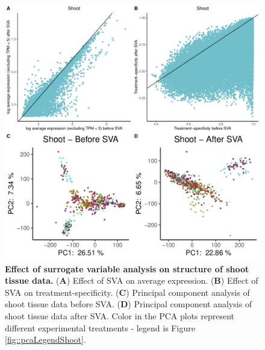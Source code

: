 \documentclass[12pt]{article}
\begin{document}
\begin{figure}[H]
\centering
\includegraphics[width = \linewidth]{figures/appendix_a/pca_beforeAndAfterSva_shoot_2023-02-21.pdf}
\caption{\textbf{Effect of surrogate variable analysis on structure of shoot tissue data.} (\textbf{A}) Effect of SVA on average expression. (\textbf{B}) Effect of SVA on treatment-specificity. (\textbf{C}) Principal component analysis of shoot tissue data before SVA. (\textbf{D}) Principal component analysis of shoot tissue data after SVA. Color in the PCA plots represent different experimental treatments - legend is Figure \ref{fig::pcaLegendShoot}.}%
\end{figure}
\end{document}
